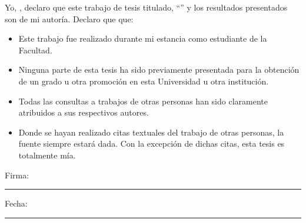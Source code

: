 \documentclass[
11pt, %
spanish, %
singlespacing, %
headsepline, %
]{MastersDoctoralThesis} %
\begin{document}

 




\begin{declaration}
\addchaptertocentry{\authorshipname} %
\noindent Yo, \authorname, declaro que este trabajo de tesis titulado, \enquote{\ttitle} y los resultados presentados son de mi autoría. Declaro que que:

\begin{itemize} 
\item Este trabajo fue realizado durante mi estancia como estudiante de la Facultad.
\item Ninguna parte de esta tesis ha sido previamente presentada para la obtención de un grado u otra promoción en esta Universidad u otra institución.
\item Todas las consultas a trabajos de otras personas han sido claramente atribuidos a sus respectivos autores.
\item Donde se hayan realizado citas textuales del trabajo de otras personas, la fuente siempre estará dada. Con la excepción de dichas citas, esta tesis es totalmente mía.
\end{itemize}
 
\noindent Firma:\\
\rule[0.5em]{25em}{0.5pt} %
 
\noindent Fecha:\\
\rule[0.5em]{25em}{0.5pt} %
\end{declaration}

\cleardoublepage


\vspace*{0.2\textheight}
\end{document}
